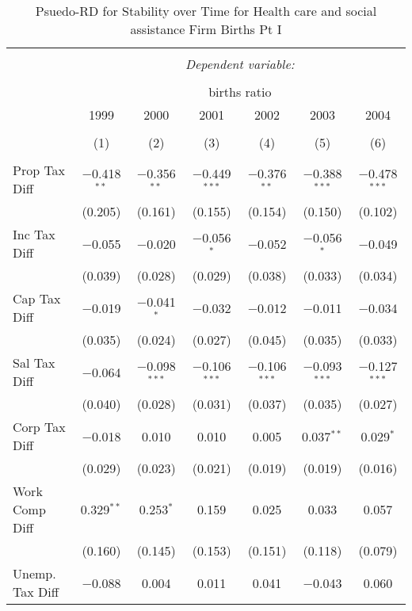 
\begin{table}[!htbp] \centering 
  \caption{Psuedo-RD for Stability over Time for  Health care and social assistance Firm Births Pt I} 
  \label{62year} 
\small 
\begin{tabular}{@{\extracolsep{5pt}}lcccccc} 
\\[-1.8ex]\hline 
\hline \\[-1.8ex] 
 & \multicolumn{6}{c}{\textit{Dependent variable:}} \\ 
\cline{2-7} 
\\[-1.8ex] & \multicolumn{6}{c}{births ratio} \\ 
 & 1999 & 2000 & 2001 & 2002 & 2003 & 2004 \\ 
\\[-1.8ex] & (1) & (2) & (3) & (4) & (5) & (6)\\ 
\hline \\[-1.8ex] 
 Prop Tax Diff & $-$0.418$^{**}$ & $-$0.356$^{**}$ & $-$0.449$^{***}$ & $-$0.376$^{**}$ & $-$0.388$^{***}$ & $-$0.478$^{***}$ \\ 
  & (0.205) & (0.161) & (0.155) & (0.154) & (0.150) & (0.102) \\ 
  Inc Tax Diff & $-$0.055 & $-$0.020 & $-$0.056$^{*}$ & $-$0.052 & $-$0.056$^{*}$ & $-$0.049 \\ 
  & (0.039) & (0.028) & (0.029) & (0.038) & (0.033) & (0.034) \\ 
  Cap Tax Diff & $-$0.019 & $-$0.041$^{*}$ & $-$0.032 & $-$0.012 & $-$0.011 & $-$0.034 \\ 
  & (0.035) & (0.024) & (0.027) & (0.045) & (0.035) & (0.033) \\ 
  Sal Tax Diff & $-$0.064 & $-$0.098$^{***}$ & $-$0.106$^{***}$ & $-$0.106$^{***}$ & $-$0.093$^{***}$ & $-$0.127$^{***}$ \\ 
  & (0.040) & (0.028) & (0.031) & (0.037) & (0.035) & (0.027) \\ 
  Corp Tax Diff & $-$0.018 & 0.010 & 0.010 & 0.005 & 0.037$^{**}$ & 0.029$^{*}$ \\ 
  & (0.029) & (0.023) & (0.021) & (0.019) & (0.019) & (0.016) \\ 
  Work Comp Diff & 0.329$^{**}$ & 0.253$^{*}$ & 0.159 & 0.025 & 0.033 & 0.057 \\ 
  & (0.160) & (0.145) & (0.153) & (0.151) & (0.118) & (0.079) \\ 
  Unemp. Tax Diff & $-$0.088 & 0.004 & 0.011 & 0.041 & $-$0.043 & 0.060 \\ 

\end{tabular}
\end{table}
